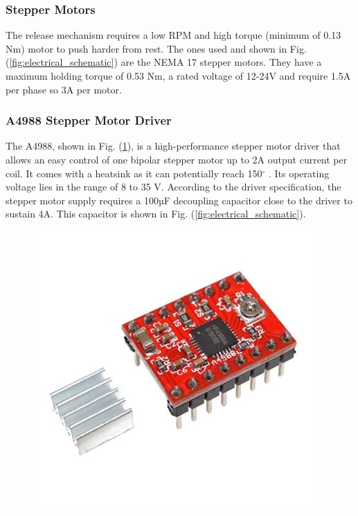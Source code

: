 \documentclass[11pt,landscape]{article}
\begin{document}
\begin{multicols}{3}
\subsubsection{Stepper Motors}
The release mechanism requires a low RPM and high torque (minimum of 0.13 Nm)
motor to push harder from rest. The ones used and shown in Fig.
(\ref{fig:electrical_schematic}) are the NEMA 17 stepper motors. They have a
maximum holding torque of 0.53 Nm, a rated voltage of 12-24V and require 1.5A
per phase so 3A per motor. 

\subsubsection{A4988 Stepper Motor Driver}
The A4988, shown in Fig. (\ref{fig:stepper_driver}), is a high-performance
stepper motor driver that allows an easy control of one bipolar stepper motor up
to 2A output current per coil. It comes with a heatsink as it can potentially
reach 150$^{\circ}$ \cite{stepper_driver}.
Its operating voltage lies in the range of 8 to 35 V. According to the driver
specification, the stepper motor supply requires a 100µF decoupling capacitor
close to the driver to sustain 4A. This capacitor is shown in Fig.
(\ref{fig:electrical_schematic}).

\begin{figure}[H]
    \begin{center}
    \includegraphics[]{stepper_driver.jpg}
    \label{fig:stepper_driver}
    \end{center}
\end{figure}


\end{multicols}
\end{document}
